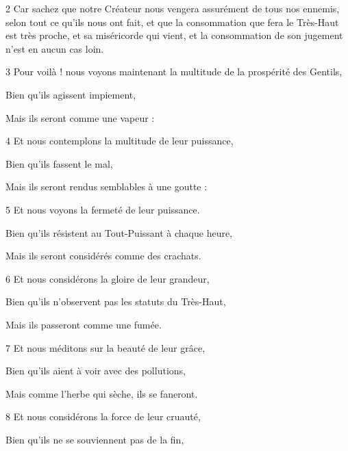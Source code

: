 \par 2 Car sachez que notre Créateur nous vengera assurément de tous nos ennemis, selon tout ce qu'ils nous ont fait, et que la consommation que fera le Très-Haut est très proche, et sa miséricorde qui vient, et la consommation de son jugement n’est en aucun cas loin.

\par 3 Pour voilà ! nous voyons maintenant la multitude de la prospérité des Gentils,

\par Bien qu'ils agissent impiement,

\par Mais ils seront comme une vapeur :

\par 4 Et nous contemplons la multitude de leur puissance,

\par Bien qu'ils fassent le mal,

\par Mais ils seront rendus semblables à une goutte :

\par 5 Et nous voyons la fermeté de leur puissance.

\par Bien qu'ils résistent au Tout-Puissant à chaque heure,

\par Mais ils seront considérés comme des crachats.

\par 6 Et nous considérons la gloire de leur grandeur,

\par Bien qu'ils n'observent pas les statuts du Très-Haut,

\par Mais ils passeront comme une fumée.

\par 7 Et nous méditons sur la beauté de leur grâce,

\par Bien qu'ils aient à voir avec des pollutions,

\par Mais comme l'herbe qui sèche, ils se faneront.

\par 8 Et nous considérons la force de leur cruauté,

\par Bien qu'ils ne se souviennent pas de la fin,

